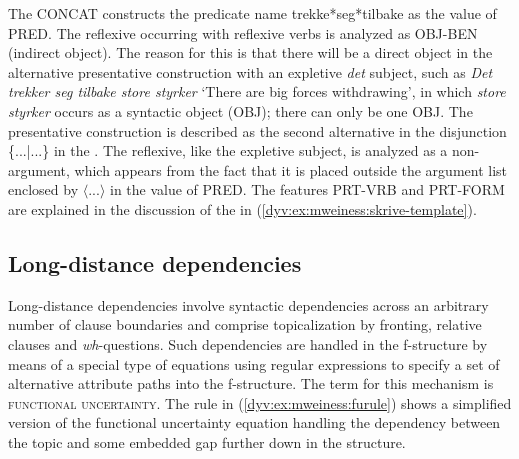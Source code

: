 \documentclass[output=paper]{langsci/langscibook}
\begin{document}
The  \textsf{CONCAT} constructs the predicate name \textsf{trekke*seg*tilbake} as the value of \textsf{PRED}.
The reflexive occurring with reflexive verbs is analyzed as \textsf{OBJ-BEN} (indirect object).
The reason for this is that there will be a direct object in the alternative presentative construction with an expletive \textit{det} subject, such as \textit{Det trekker seg tilbake store styrker} `There are big forces withdrawing', in which \textit{store styrker} occurs as a syntactic object (OBJ); there can only be one \textsf{OBJ}.
The presentative construction is described as the second alternative in the disjunction \textsf{\{...|...\}} in the .
The reflexive, like the expletive subject, is analyzed as a non-argument, which appears from the fact that it is placed outside the argument list enclosed by \textsf{$\langle$...$\rangle$} in the value of \textsf{PRED}.
The features \textsf{PRT-VRB} and \textsf{PRT-FORM} are explained in the discussion of the  in (\ref{dyv:ex:mweiness:skrive-template}).

\subsection{Long-distance dependencies}\label{dyv:sec:mweiness:longdist}

Long-distance dependencies involve syntactic dependencies across an arbitrary number of clause boundaries and comprise topicalization by fronting, relative clauses and \textit{wh}-questions.
Such dependencies are handled in the f-structure by means of a special type of equations using regular expressions to specify a set of alternative attribute paths into the f-structure.
The term for this mechanism is \textsc{functional uncertainty}.
The rule in (\ref{dyv:ex:mweiness:furule}) shows a simplified version of the functional uncertainty equation handling the dependency between the topic and some embedded gap further down in the structure.

\end{document}
